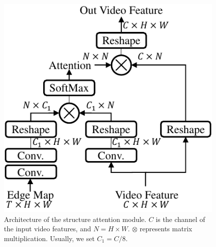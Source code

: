  \begin{figure}[t]
	\centering
	\includegraphics[width=0.7\columnwidth]{SEM} %
	\caption{Architecture of the structure attention module. $C$ is the channel of the input video features, and $N=H\times W$. $\otimes$ represents matrix multiplication. Usually, we set $C_1=C/8$.}
	\label{SEM}
\end{figure} 



